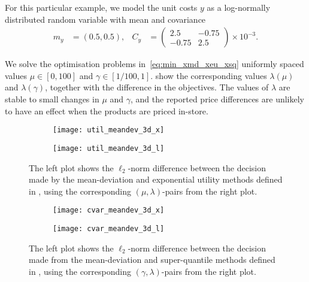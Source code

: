 \documentclass[main.tex]{subfiles}
\begin{document}
\begin{example}
  For this particular example, we model the unit costs $y$ as a log-normally
  distributed random variable with mean and covariance
  \begin{align}
    m_y
    &= (0.5,0.5),
    &C_y
    &=\begin{pmatrix}
      2.5&-0.75\\
      -0.75&2.5
    \end{pmatrix}
             \times 10^{-3}.
  \end{align}

  We solve the optimisation problems in~\eqref{eq:min_xmd_xeu_xsq}
  uniformly spaced values $\mu\in[0,100]$ and $\gamma\in[1/100, 1]$.
   show the
  corresponding values $\lambda(\mu)$ and $\lambda(\gamma)$, together
  with the difference in the objectives. The values of $\lambda$
  are stable to small changes in $\mu$ and $\gamma$, and the
  reported price differences are unlikely to have an effect when
  the products are priced in-store.
  \begin{figure}[htbp]
    \centering
    \begin{subfigure}[t]{.5\textwidth}
      \texttt{[image: util\_meandev\_3d\_x]}
    \end{subfigure}%
    \begin{subfigure}[t]{.5\textwidth}
      \texttt{[image: util\_meandev\_3d\_l]}
    \end{subfigure}
    \caption{The left plot shows the $\ell_2$-norm difference between the decision made
      by the mean-deviation and exponential utility methods defined in
      , using the corresponding
      $(\mu,\lambda)$-pairs from the right plot.
    }\label{fig:util_meandev_2d}
  \end{figure}

  \begin{figure}[hbtp]
    \centering
    \begin{subfigure}[t]{.5\textwidth}
      \texttt{[image: cvar\_meandev\_3d\_x]}
    \end{subfigure}%
    \begin{subfigure}[t]{.5\textwidth}
      \texttt{[image: cvar\_meandev\_3d\_l]}
    \end{subfigure}
    \caption{The left plot shows the $\ell_2$-norm difference between the decision made
      from the mean-deviation and super-quantile methods defined in
      , using the corresponding
      $(\gamma,\lambda)$-pairs from the right plot.
    }\label{fig:cvar_meandev_2d}
  \end{figure}
\end{example}
\end{document}
